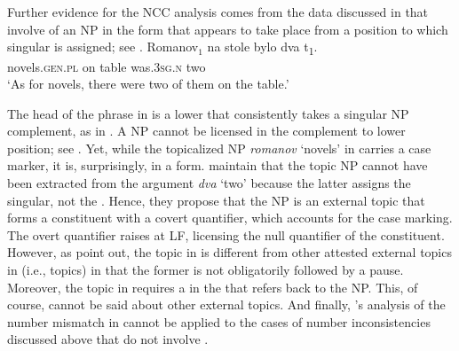 \documentclass[output=paper,modfonts,newtxmath,hidelinks]{langscibook}
\begin{document}
\section{\citet{Franks-House1982}}\label{18:s4}
Further evidence for the NCC analysis comes from the data discussed in \citet{Franks-House1982} that involve  of an NP in the   form that appears to take place from a position to which  singular is assigned; see .
\ea \label{18:ex27}
\gll Romanov$_1$  na  stole  bylo  dva         t\textsubscript{1}.\\
     novels.\textsc{gen.pl}  on  table  was.\textsc{3sg.n}  two\\\hfill\citep[157]{Franks-House1982}
\glt `As for novels, there were two of them on the table.'\\
\z
\ea \label{18:ex28}
	\z
\z 

\noindent The head of the  phrase in  is a lower  that consistently takes a  singular NP complement, as in . A   NP cannot be licensed in the complement to lower  position; see . Yet, while the topicalized NP \textit{romanov} ‘novels’ in  carries a  case marker, it is, surprisingly, in a  form. \citeauthor{Franks-House1982} maintain that the topic NP cannot have been extracted from the argument \textit{dva} ‘two’ because the latter assigns the  singular, not the  . Hence, they propose that the  NP is an external topic that forms a constituent with a covert quantifier, which accounts for the  case marking. The overt quantifier raises at LF, licensing the null quantifier of the  constituent. However, as \citeauthor{Franks-House1982} point out, the  topic in  is different from other attested external topics in  (i.e.,  topics) in that the former is not obligatorily followed by a pause. Moreover, the  topic in  requires a  in the  that refers back to the  NP. This, of course, cannot be said about other external topics. And finally, \citeauthor{Franks-House1982}’s analysis of the number  mismatch in  cannot be applied to the cases of number  inconsistencies discussed above that do not involve . 
\end{document}

